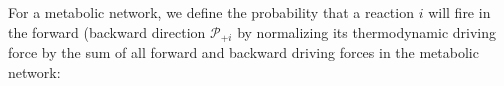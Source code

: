 For a metabolic network, we define the probability that a reaction $i$ will fire in the forward (backward direction ${\mathcal P_{+i}}$ by normalizing its thermodynamic driving force by the sum of all forward and backward driving forces in the metabolic network: